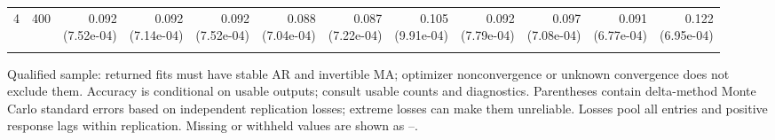 \begin{table}[p]
{\begin{tabular}{llrrrrrrrrrr}
4 & 400 & \shortstack{0.092\\(7.52e-04)} & \shortstack{0.092\\(7.14e-04)} & \shortstack{0.092\\(7.52e-04)} & \shortstack{0.088\\(7.04e-04)} & \shortstack{0.087\\(7.22e-04)} & \shortstack{0.105\\(9.91e-04)} & \shortstack{0.092\\(7.79e-04)} & \shortstack{0.097\\(7.08e-04)} & \shortstack{0.091\\(6.77e-04)} & \shortstack{0.122\\(6.95e-04)} \\
\addlinespace
\bottomrule\end{tabular}}
\par\medskip
\begin{minipage}{\linewidth}\footnotesize Qualified sample: returned fits must have stable AR and invertible MA; optimizer nonconvergence or unknown convergence does not exclude them. Accuracy is conditional on usable outputs; consult usable counts and diagnostics. Parentheses contain delta-method Monte Carlo standard errors based on independent replication losses; extreme losses can make them unreliable. Losses pool all entries and positive response lags within replication. Missing or withheld values are shown as --.\end{minipage}
\end{table}
